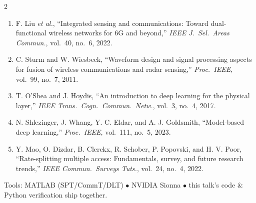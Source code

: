 \documentclass[a4paper,9pt]{extarticle}
\begin{document}
\begin{multicols}{2}
\begin{enumerate}[leftmargin=1.4em,itemsep=0.5pt]
        by reconfigurable intelligent surfaces,'' \emph{IEEE J.\ Sel.\
        Areas Commun.}, vol.\ 38, no.\ 11, 2020.
  \item F. Liu \emph{et al.}, ``Integrated sensing and communications:
        Toward dual-functional wireless networks for 6G and beyond,''
        \emph{IEEE J.\ Sel.\ Areas Commun.}, vol.\ 40, no.\ 6, 2022.
  \item C. Sturm and W. Wiesbeck, ``Waveform design and signal processing
        aspects for fusion of wireless communications and radar
        sensing,'' \emph{Proc.\ IEEE}, vol.\ 99, no.\ 7, 2011.
  \item T. O'Shea and J. Hoydis, ``An introduction to deep learning for
        the physical layer,'' \emph{IEEE Trans.\ Cogn.\ Commun.\ Netw.},
        vol.\ 3, no.\ 4, 2017.
  \item N. Shlezinger, J. Whang, Y. C. Eldar, and A. J. Goldsmith,
        ``Model-based deep learning,'' \emph{Proc.\ IEEE}, vol.\ 111,
        no.\ 5, 2023.
  \item Y. Mao, O. Dizdar, B. Clerckx, R. Schober, P. Popovski, and
        H. V. Poor, ``Rate-splitting multiple access: Fundamentals,
        survey, and future research trends,'' \emph{IEEE Commun.\
        Surveys Tuts.}, vol.\ 24, no.\ 4, 2022.
\end{enumerate}
\end{multicols}

\vspace{1pt}
{\footnotesize\color{gray}Tools: MATLAB (SPT/CommT/DLT) $\bullet$ NVIDIA Sionna
$\bullet$ this talk's code \& Python verification ship together.}
\end{document}
